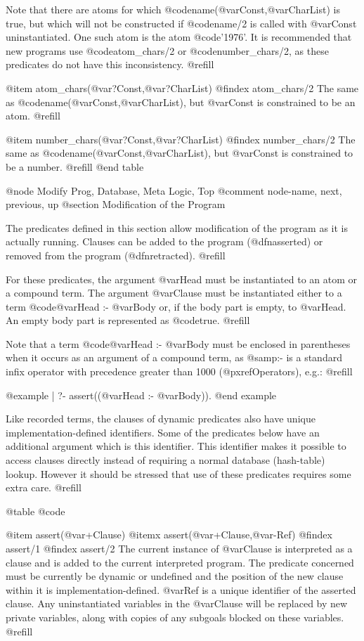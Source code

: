 Note that there are atoms for which
@code{name(@var{Const},@var{CharList})} is true, but which will not be
constructed if @code{name/2} is called with @var{Const} uninstantiated.
One such atom is the atom @code{'1976'}.  It is recommended that new
programs use @code{atom_chars/2} or @code{number_chars/2}, as these
predicates do not have this inconsistency. @refill

@item atom_chars(@var{?Const},@var{?CharList})
@findex atom_chars/2
The same as @code{name(@var{Const},@var{CharList})}, but @var{Const}
is constrained to be an atom. @refill

@item number_chars(@var{?Const},@var{?CharList})
@findex number_chars/2
The same as @code{name(@var{Const},@var{CharList})}, but @var{Const}
is constrained to be a number. @refill
@end table

@node Modify Prog, Database, Meta Logic, Top
@comment  node-name,  next,  previous,  up
@section Modification of the Program

The predicates defined in this section allow modification of the program
as it is actually running.  Clauses can be added to the program
(@dfn{asserted}) or removed from the program (@dfn{retracted}). @refill

For these predicates, the argument @var{Head} must be instantiated to an
atom or a compound term.  The argument @var{Clause} must be instantiated
either to a term @code{@var{Head} :- @var{Body}} or, if the body part is
empty, to @var{Head}.  An empty body part is represented as @code{true}.
@refill

Note that a term @code{@var{Head} :- @var{Body}} must be enclosed in
parentheses when it occurs as an argument of a compound term, as
@samp{:-} is a standard infix operator with precedence greater than 1000
(@pxref{Operators}), e.g.: @refill

@example
| ?- assert((@var{Head} :- @var{Body})).
@end example

Like recorded terms, the clauses of dynamic predicates also have
unique implementation-defined identifiers.  Some of the predicates below
have an additional argument which is this identifier.  This identifier
makes it possible to access clauses directly instead of requiring a
normal database (hash-table) lookup.  However it should be stressed that
use of these predicates requires some extra care. @refill

@table @code

@item assert(@var{+Clause})
@itemx assert(@var{+Clause},@var{-Ref})
@findex assert/1
@findex assert/2
The current instance of @var{Clause} is interpreted as a clause and is
added to the current interpreted program.  The predicate concerned must
be currently be dynamic or undefined and the position of the new clause
within it is implementation-defined.  @var{Ref} is a unique identifier
of the asserted clause.  Any uninstantiated variables in the
@var{Clause} will be replaced by new private variables, along with
copies of any subgoals blocked on these variables. @refill

